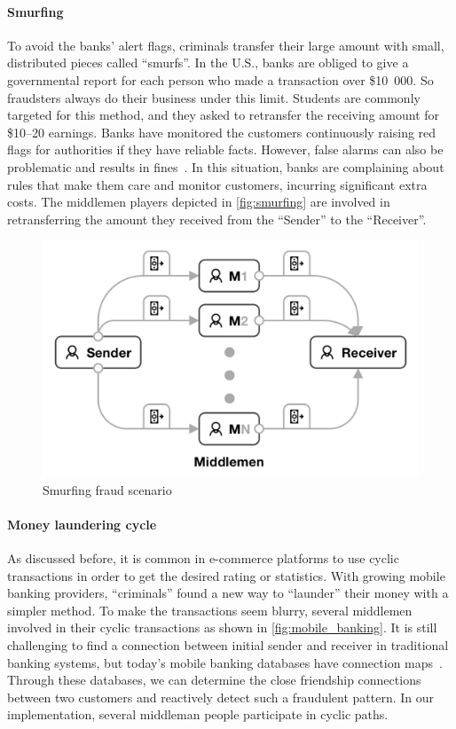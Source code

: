 \paragraph{Smurfing}

To avoid the banks' alert flags, criminals transfer their large amount with small, distributed pieces called ``smurfs''.
In the U.S., banks are obliged to give a governmental report for each person who made a transaction over \$10\ 000.
So fraudsters always do their business under this limit.
Students are commonly targeted for this method, and they asked to retransfer the receiving amount for \$10--20 earnings.
Banks have monitored the customers continuously raising red flags for authorities if they have reliable facts.
However, false alarms can also be problematic and results in fines~\cite{Bloomberg19}.
In this situation, banks are complaining about rules that make them care and monitor customers, incurring significant extra costs.
The middlemen players depicted in \autoref{fig:smurfing} are involved in retransferring the amount they received from the ``Sender'' to the ``Receiver''.

\begin{figure}[!ht]
    \centering
    \includegraphics[scale=0.3]{figures/smurfing.png}
    \caption{Smurfing fraud scenario} 
    \label{fig:smurfing}
\end{figure}

\paragraph{Money laundering cycle}

As discussed before, it is common in e-commerce platforms to use cyclic transactions in order to get the desired rating or statistics.
With growing mobile banking providers, ``criminals'' found a new way to ``launder'' their money with a simpler method.
To make the transactions seem blurry, several middlemen involved in their cyclic transactions as shown in \autoref{fig:mobile_banking}.
It is still challenging to find a connection between initial sender and receiver in traditional banking systems, but today's mobile banking databases have connection maps~\cite{EIFREM20196}.
Through these databases, we can determine the close friendship connections between two customers and reactively detect such a fraudulent pattern.
In our implementation, several middleman people participate in cyclic paths.

